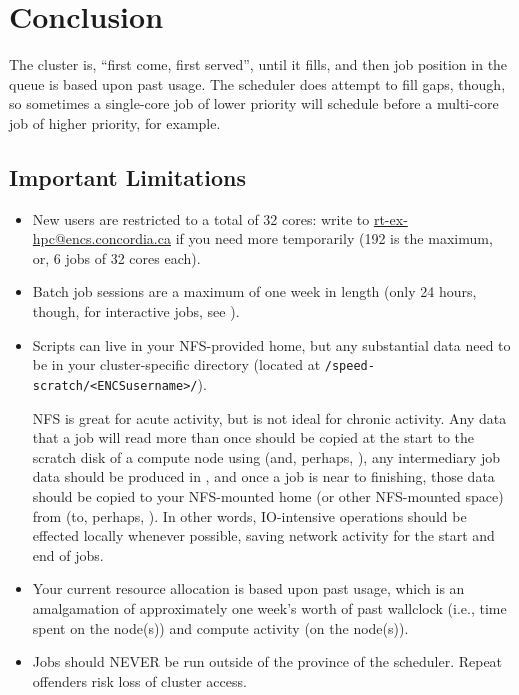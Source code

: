 \documentclass{easychair}
\begin{document}


\section{Conclusion}
\label{sect:conclusion}

The cluster is, ``first come, first served'', until it fills, and then job
position in the queue is based upon past usage. The scheduler does attempt
to fill gaps, though, so sometimes a single-core job of lower priority
will schedule before a multi-core job of higher priority, for example.

\subsection{Important Limitations}
\label{sect:limitations}

\begin{itemize}
\item
New users are restricted to a total of 32 cores: write to \url{rt-ex-hpc@encs.concordia.ca}
if you need more temporarily (192 is the maximum, or, 6 jobs of 32 cores each).

\item
Batch job sessions are a maximum of one week in length (only 24 hours, though,
for interactive jobs, see ).

\item
Scripts can live in your NFS-provided home, but any substantial data need
to be in your cluster-specific directory
(located at \verb+/speed-scratch/<ENCSusername>/+).

NFS is great for acute activity, but is not ideal for chronic activity.
Any data that a job will 
read more than once should be copied at the start to the scratch disk of a 
compute node using  (and, perhaps, ), 
any intermediary job data should be produced in , and once a 
job is near to finishing, those data should be copied to your NFS-mounted 
home (or other NFS-mounted space) from  (to, perhaps,
). In other words, IO-intensive operations should be effected 
locally whenever possible, saving network activity for the start and end of 
jobs. 

\item
Your current resource allocation is based upon past usage, which is an 
amalgamation of approximately one week's worth of past wallclock (i.e., time 
spent on the node(s)) and compute activity (on the node(s)).

\item
Jobs should NEVER be run outside of the province of the scheduler.
Repeat offenders risk loss of cluster access. 

\end{itemize}
\end{document}
